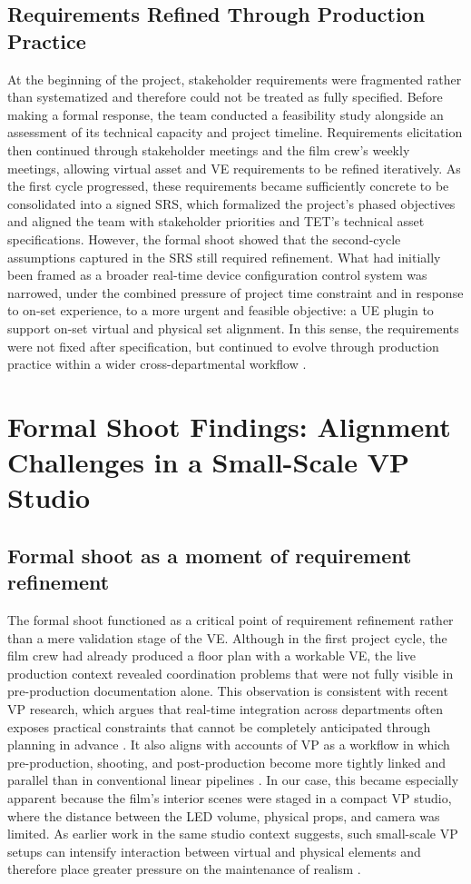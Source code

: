 \documentclass[conference]{IEEEtran}
\begin{document}
\subsection{Requirements Refined Through Production Practice}
At the beginning of the project, stakeholder requirements were fragmented rather than systematized and therefore could not be treated as fully specified. Before making a formal response, the team conducted a feasibility study alongside an assessment of its technical capacity and project timeline. Requirements elicitation then continued through stakeholder meetings and the film crew's weekly meetings, allowing virtual asset and VE requirements to be refined iteratively. As the first cycle progressed, these requirements became sufficiently concrete to be consolidated into a signed SRS, which formalized the project's phased objectives and aligned the team with stakeholder priorities and TET's technical asset specifications. However, the formal shoot showed that the second-cycle assumptions captured in the SRS still required refinement. What had initially been framed as a broader real-time device configuration control system was narrowed, under the combined pressure of project time constraint and in response to on-set experience, to a more urgent and feasible objective: a UE plugin to support on-set virtual and physical set alignment. In this sense, the requirements were not fixed after specification, but continued to evolve through production practice within a wider cross-departmental workflow \cite{Swords2024it,Dean2026workflow}.


\section{Formal Shoot Findings: Alignment Challenges in a Small-Scale VP Studio}
\subsection{Formal shoot as a moment of requirement refinement}
The formal shoot functioned as a critical point of requirement refinement rather than a mere validation stage of the VE. Although in the first project cycle, the film crew had already produced a floor plan with a workable VE, the live production context revealed coordination problems that were not fully visible in pre-production documentation alone. This observation is consistent with recent VP research, which argues that real-time integration across departments often exposes practical constraints that cannot be completely anticipated through planning in advance \cite{Swords2024it,willment2024skills,Dean2026workflow}. It also aligns with accounts of VP as a workflow in which pre-production, shooting, and post-production become more tightly linked and parallel than in conventional linear pipelines \cite{SilvaJasaui2024}. In our case, this became especially apparent because the film's interior scenes were staged in a compact VP studio, where the distance between the LED volume, physical props, and camera was limited. As earlier work in the same studio context suggests, such small-scale VP setups can intensify interaction between virtual and physical elements and therefore place greater pressure on the maintenance of realism \cite{Lam2025,Dean2026workflow}.
\end{document}
